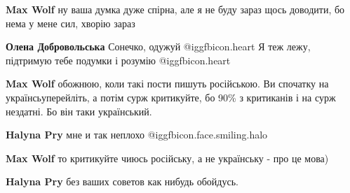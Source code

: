 \begin{itemize}
 
\textbf{Max Wolf} ну ваша думка дуже спірна, але я не буду зараз щось доводити, бо нема у мене сил, хворію зараз

 
\textbf{Олена Добровольська} Сонечко, одужуй @igg{fbicon.heart} Я теж лежу, підтримую тебе подумки і розумію
@igg{fbicon.heart}

 
\textbf{Max Wolf} обожнюю, коли такі пости пишуть російською. Ви спочатку на
українсьуперейліть, а потім сурж критикуйте, бо 90\% з критиканів і на сурж
нездатні. Бо він таки український.

 
\textbf{Halyna Pry} мне и так неплохо @igg{fbicon.face.smiling.halo} 

 
\textbf{Max Wolf} то критикуйте чиюсь російську, а не українську - про це мова)

 
\textbf{Halyna Pry} без ваших советов как нибудь обойдусь.
\end{itemize} %

